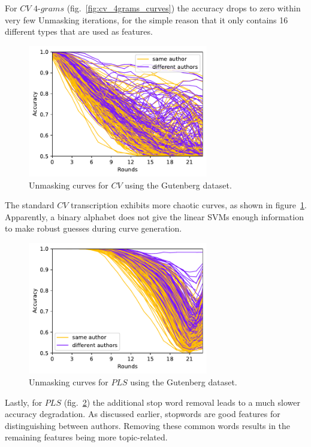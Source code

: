 For $CV$ $4$-$grams$ (fig.~\ref{fig:cv_4grams_curves}) the accuracy drops to zero within very few Unmasking iterations, for the simple reason that it only contains 16 different types that are used as features.
\begin{figure}
  \centering
  \includegraphics[width=0.7\textwidth]{figures/cv_curves}
  \caption{Unmasking curves for $CV$ using the Gutenberg dataset.}
  \label{fig:cv_curves}
\end{figure}
The standard $CV$ transcription exhibits more chaotic curves, as shown in figure~\ref{fig:cv_curves}.
Apparently, a binary alphabet does not give the linear SVMs enough information to make robust guesses during curve generation.
\begin{figure}
  \centering
  \includegraphics[width=0.7\textwidth]{figures/pls_curves}
  \caption{Unmasking curves for $PLS$ using the Gutenberg dataset.}
  \label{fig:pls_curves}
\end{figure}
Lastly, for $PLS$ (fig.~\ref{fig:pls_curves}) the additional stop word removal leads to a much slower accuracy degradation.
As discussed earlier, stopwords are good features for distinguishing between authors.
Removing these common words results in the remaining features being more topic-related.

